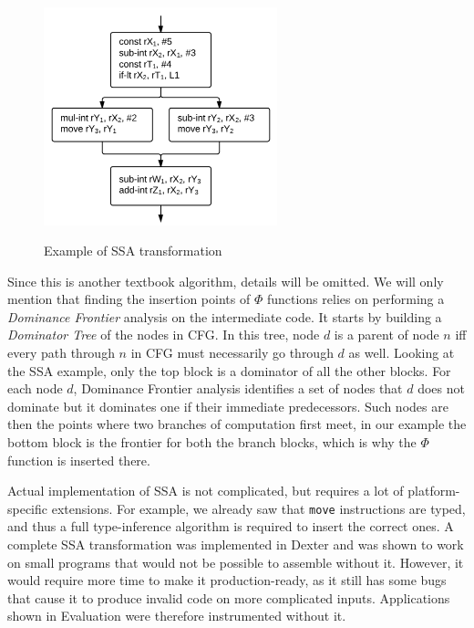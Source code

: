 \documentclass[12pt,twoside,notitlepage]{report}
\begin{document}
\begin{figure}[htp]
{  	\includegraphics[width=16pc]{figs/fig_implementation_ssa3.png}
  }
  \label{figure:Implementation_SSA3}

  \caption{Example of SSA transformation}
  \label{figure:Implementation_SSA}
\end{figure}

Since this is another textbook algorithm, details will be omitted. We will only mention that finding the insertion points of $\Phi$ functions relies on performing a \emph{Dominance Frontier} analysis on the intermediate code. It starts by building a \emph{Dominator Tree} of the nodes in CFG. In this tree, node $d$ is a parent of node $n$ iff every path through $n$ in CFG must necessarily go through $d$ as well. Looking at the SSA example, only the top block is a dominator of all the other blocks. For each node $d$, Dominance Frontier analysis identifies a set of nodes that $d$ does not dominate but it dominates one if their immediate predecessors. Such nodes are then the points where two branches of computation first meet, in our example the bottom block is the frontier for both the branch blocks, which is why the $\Phi$ function is inserted there.

Actual implementation of SSA is not complicated, but requires a lot of platform-specific extensions. For example, we already saw that \texttt{move} instructions are typed, and thus a full type-inference algorithm is required to insert the correct ones. A complete SSA transformation was implemented in Dexter and was shown to work on small programs that would not be possible to assemble without it. However, it would require more time to make it production-ready, as it still has some bugs that cause it to produce invalid code on more complicated inputs. Applications shown in Evaluation were therefore instrumented without it. 
\end{document}
